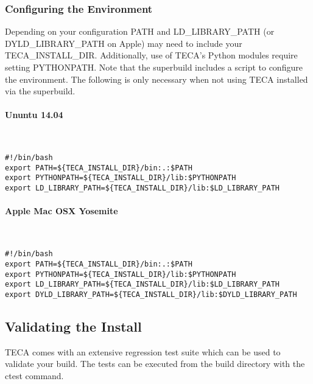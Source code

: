 \documentclass[a4paper,10pt,DIV=12]{scrreprt}
\begin{document}
\subsubsection{Configuring the Environment}
Depending on your configuration PATH and LD\_LIBRARY\_PATH (or DYLD\_LIBRARY\_PATH on Apple)
may need to include your TECA\_INSTALL\_DIR. Additionally,
use of TECA's Python modules require setting PYTHONPATH. Note that the superbuild includes
a script to configure the environment. The following is only necessary when not using
TECA installed via the superbuild.

\paragraph{Ununtu 14.04} $\;$ \\ \\
\vspace{2mm}\hspace{0.2in}\begin{minipage}{0.8\textwidth}
\begin{verbatim}
#!/bin/bash
export PATH=${TECA_INSTALL_DIR}/bin:.:$PATH
export PYTHONPATH=${TECA_INSTALL_DIR}/lib:$PYTHONPATH
export LD_LIBRARY_PATH=${TECA_INSTALL_DIR}/lib:$LD_LIBRARY_PATH
\end{verbatim}
\end{minipage}\vspace{2mm}

\paragraph{Apple Mac OSX Yosemite} $\;$ \\ \\
\vspace{2mm}\hspace{0.2in}\begin{minipage}{0.8\textwidth}
\begin{verbatim}
#!/bin/bash
export PATH=${TECA_INSTALL_DIR}/bin:.:$PATH
export PYTHONPATH=${TECA_INSTALL_DIR}/lib:$PYTHONPATH
export LD_LIBRARY_PATH=${TECA_INSTALL_DIR}/lib:$LD_LIBRARY_PATH
export DYLD_LIBRARY_PATH=${TECA_INSTALL_DIR}/lib:$DYLD_LIBRARY_PATH
\end{verbatim}
\end{minipage}\vspace{2mm}



\subsection{Validating the Install}
TECA comes with an extensive regression test suite which can be used to validate
your build. The tests can be executed from the build directory with the ctest command.
\end{document}

